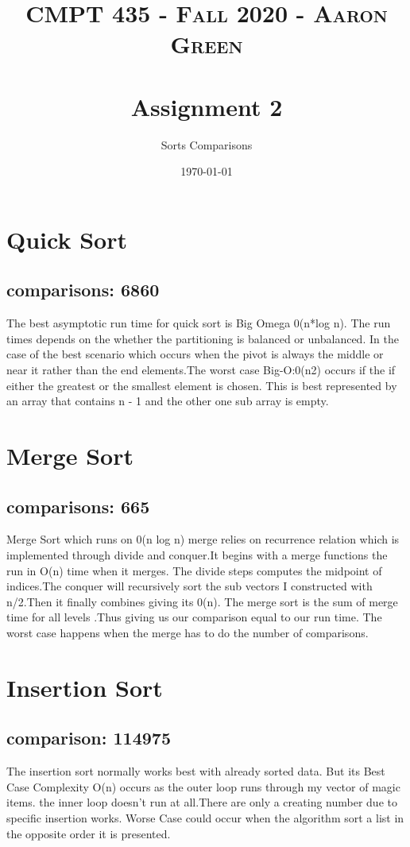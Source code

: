 \documentclass{article}
\title{
\normalfont \normalsize
\textsc{CMPT 435 - Fall 2020 - Aaron Green} \\[10pt]
\horrule\\[0.25cm]
\huge Assignment 2
\horrule\\[0.25]
}
\author{Sorts Comparisons}
\date{\normalsize\today}
\begin{document}
\maketitle %

\section{Quick Sort}
\subsection{comparisons: 6860}
\large The best asymptotic run time for quick sort is Big Omega 0(n*log n). The run times depends on the whether the partitioning is balanced or unbalanced. In the case of the best scenario which occurs when the pivot is always the middle or near it rather than the end elements.The worst case Big-O:0(n2) occurs if the if either the greatest or the smallest element is chosen. This is best represented by an array that contains n - 1 and the other one sub array is empty.
\section{Merge Sort}
\subsection {comparisons: 665}
\large Merge Sort which runs on 0(n log n) merge relies on recurrence relation which is implemented through divide and conquer.It begins with a merge functions the run in O(n) time when it merges. The divide steps computes the midpoint of indices.The conquer will recursively sort the sub vectors I constructed with n/2.Then it finally combines giving its 0(n). The merge sort is the sum of merge time for all levels .Thus giving us our comparison equal to our run time. The worst case happens when the merge has to do the number of comparisons.
\section{Insertion Sort}
\subsection{comparison: 114975}
\large The insertion sort normally works best with already sorted data. But its Best Case Complexity O(n) occurs as the outer loop runs through my vector of magic items. the inner loop doesn't run at all.There are only a creating number due to specific insertion works. Worse Case could occur when the algorithm sort a list in the opposite order it is presented.
\end{document}
